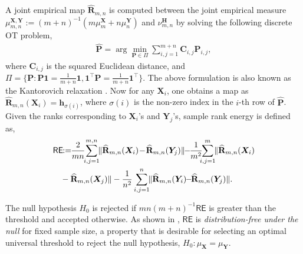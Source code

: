 \documentclass{article}
\begin{document}
A joint empirical map $\mathbf {\widehat R}_{m,n}$ is computed between the joint empirical measure {\small $\mu_{m, n}^{\bm X, \bm Y}:=(m+n)^{-1}(m\mu^{\bm X}_m + n\mu^{\bm Y}_n)$} and $\nu_{m,n}^{\mathbf{H}}$ by solving the following discrete OT problem,
{\small  
  \setlength{\abovedisplayskip}{1.5pt}
  \setlength{\belowdisplayskip}{\abovedisplayskip}
  \setlength{\abovedisplayshortskip}{0pt}
  \setlength{\belowdisplayshortskip}{3pt}
\begin{align}
\label{eq:linear}
    \mathbf{\widehat P}= \arg \min_{\mathbf{P} \in \Pi} \sum_{i,j = 1}^{m+n} \mathbf{C}_{i,j} \mathbf{P}_{i,j},
\end{align}
}%
where {\small$\mathbf{C}_{i,j}$} is the squared Euclidean distance, and {\small $\Pi = \{ \mathbf{P}: \mathbf{P} \bm{1} = \frac{1}{m+n} \bm{1}, \bm{1}^\top \mathbf{P} = \frac{1}{m+n} \bm{1}^\top\}$}. The above formulation is also known as the Kantorovich relaxation \cite{peyre2019computational}. Now for any $\bm X_i$, one obtains a map as {\small $\widehat{\mathbf{R}}_{m,n}(\bm{X}_i) \!\!= \!\!\bm{h}_{\sigma(i)}$}, where $\sigma(i)$ is the non-zero index in the $i$-th row of $\widehat{\mathbf{P}}$. Given the ranks corresponding to $\bm X_i$'s and $\bm Y_j$'s, sample rank energy \cite{deb2021multivariate} is defined as, 
{\small  
  \setlength{\abovedisplayskip}{3pt}
  \setlength{\belowdisplayskip}{\abovedisplayskip}
  \setlength{\abovedisplayshortskip}{0pt}
  \setlength{\belowdisplayshortskip}{3pt}
\begin{align}\label{eqn:RE}
   \mathsf{RE}\!\! &:= \!\!\frac{2}{mn}\!\! \sum_{i, j=1}^{m, n} \!\!\|\widehat{\mathbf{R}}_{m,n}(\bm X_i)\! -\!\widehat{\mathbf{R}}_{m,n}(\bm Y_j)\| \!\! - \!\!\frac{1}{m^2}\!\!\!\sum_{i, j=1}^{m}\!\! \|\widehat{\mathbf{R}}_{m,n}(\bm X_i) \notag \\&- \widehat{\mathbf{R}}_{m,n}(\bm X_j)\| -
    \frac{1}{n^2} \sum_{i, j=1}^{n} \!\!\|\widehat{\mathbf{R}}_{m,n}(\bm Y_i)\!\! -\!\! \widehat{\mathbf{R}}_{m,n}(\bm Y_j)\|.
\end{align}
}

The null hypothesis $H_0$ is rejected if {\small $mn(m+n)^{-1}\mathsf{RE}$} is greater than the threshold and accepted otherwise. As shown in \cite{deb2021multivariate}, {\small $\mathsf{RE}$} is \textit{distribution-free under the null} for fixed sample size, a property that is desirable for selecting an optimal universal threshold to reject the null hypothesis, {\small $H_0:\mu_{\bm X}=\mu_{\bm Y}$}. 
\end{document}
